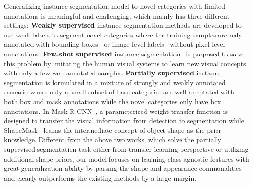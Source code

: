 \documentclass[runningheads]{llncs}
\begin{document}
Generalizing instance segmentation model to novel categories with limited annotations is meaningful and challenging, which mainly has three different settings:  
{\bf Weakly supervised} instance segmentation methods are developed to use weak labels to segment novel categories where the training samples are only annotated with bounding boxes~\cite{khoreva2017simple,remez2018learning} or image-level labels~\cite{ahn2019weakly,zhou2018weakly} without pixel-level annotations. {\bf Few-shot supervised} instance segmentation~\cite{yan2019metarcnn} is proposed to solve this problem by imitating the human visual systems to learn new visual concepts with only a few well-annotated samples. 
{\bf Partially supervised} instance segmentation is formulated in a mixture of strongly and weakly annotated scenario where only a small subset of base categories are well-annotated with both box and mask annotations while the novel categories only have box annotations. 
In Mask R-CNN~\cite{hu2018learning}, a parameterized weight transfer function is designed to transfer the visual information from detection to segmentation while ShapeMask~\cite{kuo2019shapemask} learns the intermediate concept of object shape as the prior knowledge. 
Different from the above two works, which solve the partially supervised segmentation task either from transfer learning perspective or utilizing additional shape priors, our model focuses on learning class-agnostic features with great generalization ability by parsing the shape and appearance commonalities and clearly outperforms the existing methods by a large margin.




\vspace{-3mm}
\end{document}
